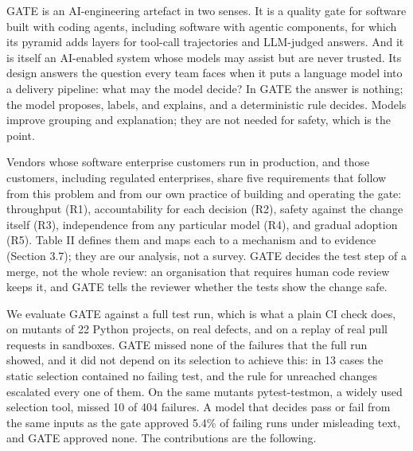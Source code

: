 \documentclass[conference]{IEEEtran}
\begin{document}
GATE is an AI-engineering artefact in two senses. It is a quality gate for software built with coding agents, including software with agentic components, for which its pyramid adds layers for tool-call trajectories and LLM-judged answers. And it is itself an AI-enabled system whose models may assist but are never trusted. Its design answers the question every team faces when it puts a language model into a delivery pipeline: what may the model decide? In GATE the answer is nothing; the model proposes, labels, and explains, and a deterministic rule decides. Models improve grouping and explanation; they are not needed for safety, which is the point.

Vendors whose software enterprise customers run in production, and those customers, including regulated enterprises, share five requirements that follow from this problem and from our own practice of building and operating the gate: throughput (R1), accountability for each decision (R2), safety against the change itself (R3), independence from any particular model (R4), and gradual adoption (R5). Table II defines them and maps each to a mechanism and to evidence (Section 3.7); they are our analysis, not a survey. GATE decides the test step of a merge, not the whole review: an organisation that requires human code review keeps it, and GATE tells the reviewer whether the tests show the change safe.

We evaluate GATE against a full test run, which is what a plain CI check does, on mutants of 22 Python projects, on real defects, and on a replay of real pull requests in sandboxes. GATE missed none of the failures that the full run showed, and it did not depend on its selection to achieve this: in 13 cases the static selection contained no failing test, and the rule for unreached changes escalated every one of them. On the same mutants pytest-testmon, a widely used selection tool, missed 10 of 404 failures. A model that decides pass or fail from the same inputs as the gate approved 5.4\% of failing runs under misleading text, and GATE approved none. The contributions are the following.
\end{document}
